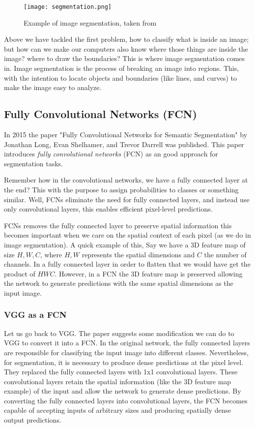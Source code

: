 \documentclass[10pt, twocolumn]{article}
\begin{document}
\begin{figure}[ht]
  \centering
  \texttt{[image: segmentation.png]}
    \caption{Example of image segmentation, taken from \cite{seg}}
    \label{fig:segmentation}
\end{figure}

Above we have tackled the first problem, how to classify what is inside an
image; but how can we make our computers also know where those things are
inside the image? where to draw the boundaries? This is where image
segmentation comes in. Image segmentation is the process of breaking an image
into regions. This, with the intention to locate objects and boundaries (like
lines, and curves) to make the image easy to analyze.

\subsection{Fully Convolutional Networks (FCN)}

In 2015 the paper "Fully Convolutional Networks for Semantic Segmentation" by
Jonathan Long, Evan Shelhamer, and Trevor Darrell was published. This paper
introduces \emph{fully convolutional networks} (FCN) as an good approach for
segmentation tasks.

Remember how in the convolutional networks, we have a fully connected layer at
the end? This with the purpose to assign probabilities to classes or something
similar. Well, FCNs eliminate the need for fully connected layers, and instead
use only convolutional layers, this enables efficient pixel-level predictions.

FCNs removes the fully connected layer to preserve spatial information this
becomes important when we care on the spatial context of each pixel (as we do
in image segmentation). A quick example of this, Say we have a 3D feature map
of size $H,W,C$, where $H,W$ represents the spatial dimensions and $C$ the
number of channels. In a fully connected layer in order to flatten that we
would have get the product of $HWC$. However, in a FCN the 3D feature map is
preserved allowing the network to generate predictions with the same spatial
dimensions as the input image.

\subsubsection{VGG as a FCN}

Let us go back to VGG. The paper suggests some modification we can do to VGG to
convert it into a FCN. In the original network, the fully connected layers are
responsible for classifying the input image into different classes.
Nevertheless, for segmentation, it is necessary to produce dense predictions at
the pixel level. They replaced the fully connected layers with 1x1
convolutional layers. These convolutional layers retain the spatial information
(like the 3D feature map example) of the input and allow the network to
generate dense predictions. By converting the fully connected layers into
convolutional layers, the FCN becomes capable of accepting inputs of arbitrary
sizes and producing spatially dense output predictions.
\end{document}
